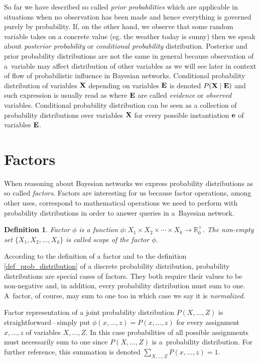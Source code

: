 \documentclass[english,cover]{fitthesis} %
\newtheorem{math_def}{Definition}[chapter] %
\newcommand{\term}[1]{\emph{#1}}           %
\newcommand{\vars}[1]{{\bold{#1}}}         %
\begin{document}
So far we have described so called \term{prior probabilities} which are applicable in situations when no observation has been made and hence everything is governed purely by probability. If, on the other hand, we observe that some random variable takes on a concrete value (eg. the weather today is sunny) then we speak about \term{posterior probability} or \term{conditional probability} distribution.
Posterior and prior probability distributions are not the same in general because observation of a~variable may affect distribution of other variables as we will see later in context of flow of probabilistic influence in Bayesian networks.
Conditional probability distribution of variables $\vars{X}$ depending on variables $\vars{E}$ is denoted $P(\vars{X}\mid\vars{E})$ and such expression is usually read as \uv{probability of $\vars{X}$ given $\vars{E}$} where $\vars{E}$ are called \term{evidence} or \term{observed} variables. Conditional probability distribution can be seen as a collection of probability distributions over variables $\vars{X}$ for every possible instantiation $\vars{e}$ of variables $\vars{E}$.


\section{Factors}
When reasoning about Bayesian networks we express probability distributions as so called \term{factors}. Factors are interesting for us because factor operations, among other uses, correspond to mathematical operations we need to perform with probability distributions in order to answer queries in a~Bayesian network.
\begin{math_def}\label{def_factor}
    Factor $\phi$ is a function $\phi: X_1 \times X_2 \times \dotsm \times X_k \rightarrow \mathbb{R}_0^+$. The non-empty set $\lbrace X_1, X_2, \dots, X_k \rbrace$ is called scope of the factor $\phi$.
\end{math_def}
According to the definition of a factor and to the definition \ref{def_prob_distribution} of a discrete probability distribution, probability distributions are special cases of factors. They both require their values to be non-negative and, in addition, every probability distribution must sum to one. A~factor, of course, may sum to one too in which case we say it is \term{normalized}.

Factor representation of a joint probability distribution $P(X,\dots,Z)$ is straightforward\,--\,simply put $\phi(x,\dots,z) = P(x,\dots,z)$ for every assignment $x,\dots,z$ of variables $X,\dots,Z$. In this case probabilities of all possible assignments must necessarily sum to one since $P(X,\dots,Z)$ is a~probability distribution. For further reference, this summation is denoted $\sum_{X,\dots,Z} P(x,\dots,z) = 1$.
\end{document}
